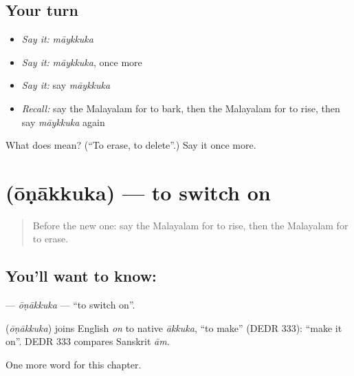 \subsection*{Your turn}
\begin{itemize}
\raggedright
  \item \emph{Say it:} \emph{māykkuka}
  \item \emph{Say it:} \emph{māykkuka}, once more
  \item \emph{Say it:} say \emph{māykkuka}
  \item \emph{Recall:} say the Malayalam for to bark, then the Malayalam for to rise, then say \emph{māykkuka} again
\end{itemize}

\begin{tcolorbox}[breakable,colback=teal!4,colframe=teal!35!black,title={Before you move on}]
What does  mean? (\textquotedblleft{}To erase, to delete\textquotedblright{}.) Say it once more.
\end{tcolorbox}
\section[\texorpdfstring{\ml{ഓണാക്കുക} (ōṇākkuka)}{ഓണാക്കുക (ōṇākkuka)}]{ (ōṇākkuka) — to switch on}

\label{lesson:ML-C188-onakkuka}



\begin{quote}
Before the new one: say the Malayalam for to rise, then the Malayalam for to erase.
\end{quote}

\subsection*{You'll want to know: }
\textbf{} — \emph{ōṇākkuka} — \textquotedblleft{}to switch on\textquotedblright{}.

\begin{cousinweb}
\textbf{} (\emph{ōṇākkuka}) joins English \emph{on} to native \emph{ākkuka}, \textquotedblleft{}to make\textquotedblright{} (DEDR 333): \textquotedblleft{}make it on\textquotedblright{}. DEDR 333 compares Sanskrit \emph{ām}.
\end{cousinweb}

\begin{grammarlens}[title={What you've built}]
One more word for this chapter.
\end{grammarlens}


